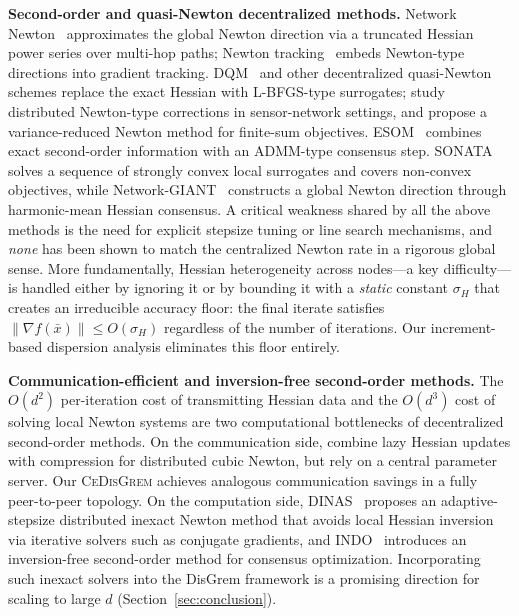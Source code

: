 \documentclass[10pt,twocolumn,letterpaper]{article}
\def\cO{O}%
\theoremstyle{compact}
\theoremstyle{compactremark}
\newcommand{\cO}{\mathcal{O}}
\begin{document}
	\noindent\textbf{Second-order and quasi-Newton decentralized methods.}
	Network Newton~\citep{mokhtari2015networknewton_arxiv} approximates
	the global Newton direction via a truncated Hessian power series
	over multi-hop paths; Newton
	tracking~\citep{mokhtari2020newtontracking} embeds Newton-type
	directions into gradient tracking.
	DQM~\citep{eisen2017dqn} and other decentralized quasi-Newton
	schemes replace the exact Hessian with L-BFGS-type surrogates;
	\citet{bajovic2017newton} study distributed Newton-type corrections
	in sensor-network settings, and \citet{zhang2021distributed} propose
	a variance-reduced Newton method for finite-sum objectives.
	ESOM~\citep{mokhtari2016esom} combines exact second-order
	information with an ADMM-type consensus step.
	SONATA~\citep{sun2022sonata} solves a sequence of strongly
	convex local surrogates and covers non-convex objectives, while
	Network-GIANT~\citep{ye2023networkgiant} constructs a
	global Newton direction through harmonic-mean Hessian consensus.
	A critical weakness shared by all the above methods is the need for
	explicit stepsize tuning or line search mechanisms, and \emph{none}
	has been shown to match the centralized Newton rate in a rigorous
	global sense.
	More fundamentally, Hessian heterogeneity across nodes---a key
	difficulty---is handled either by ignoring it or by bounding it with
	a \emph{static} constant $\sigma_H$ that creates an irreducible
	accuracy floor: the final iterate satisfies
	$\|\nabla f(\bar x)\|\le\cO(\sigma_H)$ regardless of the number
	of iterations.
	Our increment-based dispersion analysis eliminates this floor
	entirely.
	
	\noindent\textbf{Communication-efficient and inversion-free
	second-order methods.}
	The $\cO(d^2)$ per-iteration cost of transmitting Hessian data and
	the $\cO(d^3)$ cost of solving local Newton systems are two
	computational bottlenecks of decentralized second-order methods.
	On the communication side,
	\citet{zhang2024distributed} combine lazy Hessian updates with
	compression for distributed cubic Newton, but rely on a central
	parameter server.
	Our \textsc{CeDisGrem} achieves analogous communication savings
	in a fully peer-to-peer topology.
	On the computation side,
	DINAS~\citep{crane2025dinas} proposes an adaptive-stepsize
	distributed inexact Newton method that avoids local Hessian
	inversion via iterative solvers such as conjugate gradients,
	and INDO~\citep{yuan2023indo} introduces an inversion-free
	second-order method for consensus optimization.
	Incorporating such inexact solvers into the DisGrem framework
	is a promising direction for scaling to large $d$
	(Section~\ref{sec:conclusion}).
	
\end{document}
